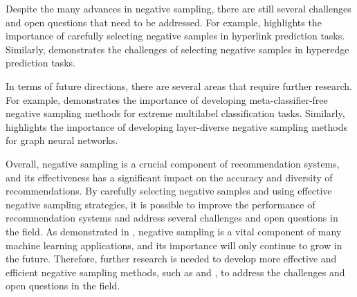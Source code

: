 \documentclass[11pt,a4paper]{article}
\begin{document}
Despite the many advances in negative sampling, there are still several challenges and open questions that need to be addressed. For example, \cite{doi:10.1007/978-3-030-47436-2_46} highlights the importance of carefully selecting negative samples in hyperlink prediction tasks. Similarly, \cite{doi:10.1145/3477495.3531836} demonstrates the challenges of selecting negative samples in hyperedge prediction tasks.

In terms of future directions, there are several areas that require further research. For example, \cite{doi:10.1007/s10994-023-06468-w} demonstrates the importance of developing meta-classifier-free negative sampling methods for extreme multilabel classification tasks. Similarly, \cite{arxiv:2403.11408} highlights the importance of developing layer-diverse negative sampling methods for graph neural networks.

Overall, negative sampling is a crucial component of recommendation systems, and its effectiveness has a significant impact on the accuracy and diversity of recommendations. By carefully selecting negative samples and using effective negative sampling strategies, it is possible to improve the performance of recommendation systems and address several challenges and open questions in the field. As demonstrated in \cite{doi:10.1109/tpami.2024.3371473}, negative sampling is a vital component of many machine learning applications, and its importance will only continue to grow in the future. Therefore, further research is needed to develop more effective and efficient negative sampling methods, such as \cite{doi:10.1007/s11063-024-11522-2} and \cite{doi:10.1109/access.2025.3576124}, to address the challenges and open questions in the field.
\end{document}
